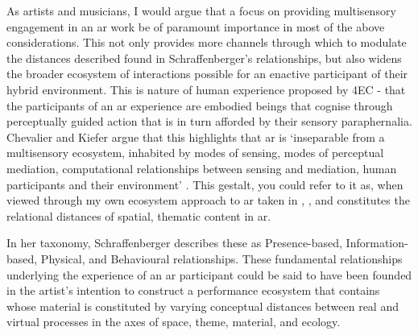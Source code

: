 As artists and musicians, I would argue that a focus on providing multisensory engagement in an \gls{ar} work be of paramount importance in most of the above considerations. This not only provides more channels through which to modulate the distances described found in Schraffenberger's relationships, but also widens the broader ecosystem of interactions possible for an enactive participant of their hybrid environment. This is nature of human experience proposed by 4EC - that the participants of an \gls{ar} experience are embodied beings that cognise through perceptually guided action that is in turn afforded by their sensory paraphernalia. 
Chevalier and Kiefer argue that this highlights that \gls{ar} is `inseparable from a multisensory ecosystem, inhabited by modes of sensing, modes of perceptual mediation, computational relationships between sensing and mediation, human participants and their environment' \citeyearpar[p. 4]{chevalier2020}. This gestalt, you could refer to it as, when viewed through my own ecosystem approach to \gls{ar} taken in \textit{}, \textit{}, and \textit{} constitutes the relational distances of spatial, thematic content in \gls{ar}. 

In her taxonomy, Schraffenberger describes these as Presence-based, Information-based, Physical, and Behavioural relationships. These fundamental relationships underlying the experience of an \gls{ar} participant could be said to have been founded in the artist's intention to construct a performance ecosystem that contains whose material is constituted by varying conceptual distances between real and virtual processes in the axes of space, theme, material, and ecology. 

